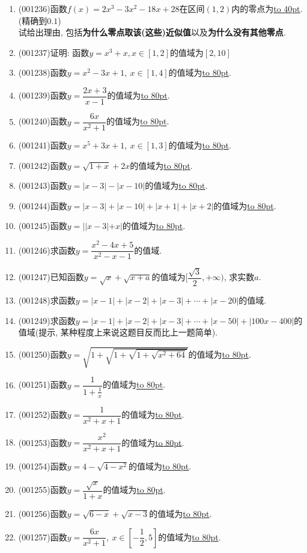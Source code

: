 \documentclass[10pt,a4paper]{article}
\newcommand{\blank}[1]{\underline{\hbox to #1pt{}}}
\begin{document}
\begin{enumerate}[1.]
\item {\tiny (001236)}函数$f(x)=2x^3-3x^2-18x+28$在区间$(1,2)$内的零点为\blank{40}.(精确到$0.1$)\\ 
试给出理由, 包括{\bf 为什么零点取该(这些)近似值}以及{\bf 为什么没有其他零点}.
\item {\tiny (001237)}证明: 函数$y=x^3+x,x\in [1,2]$的值域为$[2,10]$
\item {\tiny (001238)}函数$y=x^2-3x+1, \ x \in [1,4]$的值域为\blank{80}.
\item {\tiny (001239)}函数$y=\dfrac{2x+3}{x-1}$的值域为\blank{80}.
\item {\tiny (001240)}函数$y=\dfrac{6x}{x^2+1}$的值域为\blank{80}.
\item {\tiny (001241)}函数$y=x^5+3x+1, \ x \in [1,3]$的值域为\blank{80}.
\item {\tiny (001242)}函数$y=\sqrt{1+x}+2x$的值域为\blank{80}.
\item {\tiny (001243)}函数$y=|x-3|-|x-10|$的值域为\blank{80}.
\item {\tiny (001244)}函数$y=|x-3|+|x-10|+|x+1|+|x+2|$的值域为\blank{80}.
\item {\tiny (001245)}函数$y=||x-3|+x|$的值域为\blank{80}.
\item {\tiny (001246)}求函数$y=\dfrac{x^2-4x+5}{x^2-x-1}$的值域.
\item {\tiny (001247)}已知函数$y=\sqrt{x}+\sqrt{x+a}$的值域为$[\dfrac{\sqrt{3}}{2},+\infty)$, 求实数$a$.
\item {\tiny (001248)}求函数$y=|x-1|+|x-2|+|x-3|+\cdots+|x-20|$的值域.
\item {\tiny (001249)}求函数$y=|x-1|+|x-2|+|x-3|+\cdots+|x-50|+|100x-400|$的值域(提示, 某种程度上来说这题目反而比上一题简单).
\item {\tiny (001250)}函数$y=\sqrt{1+\sqrt{1+\sqrt{1+\sqrt{x^2+64}}}}$的值域为\blank{80}.
\item {\tiny (001251)}函数$y=\dfrac{1}{1+\frac{1}{x}}$的值域为\blank{80}.
\item {\tiny (001252)}函数$y=\dfrac{1}{x^2+x+1}$的值域为\blank{80}.
\item {\tiny (001253)}函数$y=\dfrac{x^2}{x^2+x+1}$的值域为\blank{80}.
\item {\tiny (001254)}函数$y=4-\sqrt{4-x^2}$的值域为\blank{80}.
\item {\tiny (001255)}函数$y=\dfrac{\sqrt{x}}{1+x}$的值域为\blank{80}.
\item {\tiny (001256)}函数$y=\sqrt{6-x}+\sqrt{x-3}$的值域为\blank{80}.
\item {\tiny (001257)}函数$y=\dfrac{6x}{x^2+1}, \ x \in [-\dfrac{1}{2},5]$的值域为\blank{80}.

\end{enumerate}
\end{document}
